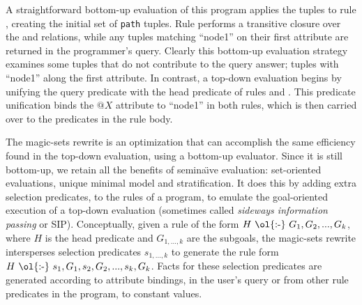 A straightforward bottom-up evaluation of this program applies the 
tuples to rule , creating the initial set of {\tt path} tuples.  Rule
 performs a transitive closure over the  and 
relations, while any  tuples matching ``node1'' on their first
attribute are returned in the programmer's query.  Clearly this bottom-up
evaluation strategy examines some  tuples that do not contribute to
the query answer; tuples with ``node1'' along the first attribute.  In
contrast, a top-down evaluation begins by unifying the query predicate with the
head predicate of rules  and .  This  predicate
unification binds the $@X$ attribute to ``node1'' in both rules, which is then
carried over to the predicates in the rule body.  

The magic-sets rewrite is an optimization that can accomplish the same
efficiency found in the top-down evaluation, using a bottom-up evaluator.
Since it is still bottom-up, we retain all the benefits of semina\"{\i}ve
evaluation: set-oriented evaluations, unique minimal model and stratification.
It does this by adding extra selection predicates, to the rules of a program, to
emulate the goal-oriented execution of a top-down evaluation (sometimes called
\emph{sideways information passing} or SIP).  Conceptually, given a rule of the
form $H\ \text{\ol{:-}}\ G_1, G_2, ..., G_k$, where $H$ is the head predicate
and $G_{1,...,k}$ are the subgoals, the magic-sets rewrite intersperses
selection predicates $s_{1,...,k}$ to generate the rule form $H\
\text{\ol{:-}}\ s_1, G_1, s_2, G_2, ..., s_{k}, G_k$.  Facts for these
selection predicates are generated according to attribute bindings, in the
user's query or from other rule predicates in the program, to constant values.

